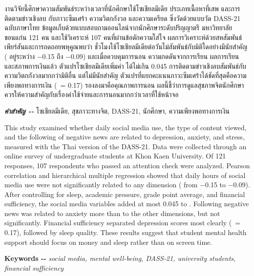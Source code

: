 

งานวิจัยนี้ศึกษาความสัมพันธ์ระหว่างเวลาที่นักศึกษาใช้โซเชียลมีเดีย ประเภทเนื้อหาที่เสพ
และการติดตามข่าวเชิงลบ กับภาวะซึมเศร้า ความวิตกกังวล และความเครียด
ซึ่งวัดด้วยแบบวัด DASS-21 ฉบับภาษาไทย
ข้อมูลเก็บด้วยแบบสอบถามออนไลน์จากนักศึกษาระดับปริญญาตรี มหาวิทยาลัยขอนแก่น 121 คน
และใช้วิเคราะห์ 107 คนที่ผ่านข้อดักความใส่ใจ
ผลการวิเคราะห์ด้วยสหสัมพันธ์เพียร์สันและการถดถอยพหุคูณพบว่า
ชั่วโมงใช้โซเชียลมีเดียต่อวันไม่สัมพันธ์กับมิติใดอย่างมีนัยสำคัญ
( อยู่ระหว่าง −0.15 ถึง −0.09)
และเมื่อควบคุมการนอน ความกดดันจากการเรียน ผลการเรียน และสภาพการเงินแล้ว
ตัวแปรโซเชียลมีเดียเพิ่มค่า \Rsq{} ได้ไม่เกิน 0.045
การติดตามข่าวเชิงลบสัมพันธ์กับความวิตกกังวลมากกว่ามิติอื่น แต่ไม่มีนัยสำคัญ
ตัวแปรที่แยกคะแนนภาวะซึมเศร้าได้ชัดที่สุดคือความเพียงพอทางการเงิน (\etasq{}~= 0.17)
รองลงมาคือคุณภาพการนอน ผลนี้ชี้ว่าการดูแลสุขภาพจิตนักศึกษา
ควรให้ความสำคัญกับเรื่องค่าใช้จ่ายและการนอนมากกว่าเวลาที่ใช้หน้าจอ

\noindent\textbf{\textit{คำสำคัญ -{}-}} โซเชียลมีเดีย, สุขภาวะทางจิต, DASS-21, นักศึกษา,
ความเพียงพอทางการเงิน

\vspace{\baselineskip}

This study examined whether daily social media use, the type of content viewed,
and the following of negative news are related to depression, anxiety, and stress,
measured with the Thai version of the DASS-21.
Data were collected through an online survey of undergraduate students at Khon Kaen University.
Of 121 responses, 107 respondents who passed an attention check were analyzed.
Pearson correlation and hierarchical multiple regression showed that daily hours of social media use
were not significantly related to any dimension ( from −0.15 to −0.09).
After controlling for sleep, academic pressure, grade point average, and financial sufficiency,
the social media variables added at most 0.045 to \Rsq.
Following negative news was related to anxiety more than to the other dimensions,
but not significantly.
Financial sufficiency separated depression scores most clearly (\etasq{}~= 0.17),
followed by sleep quality.
These results suggest that student mental health support should focus on money and sleep
rather than on screen time.

\noindent\textbf{Keywords -{}-} \textit{social media, mental well-being, DASS-21,
university students, financial sufficiency}
